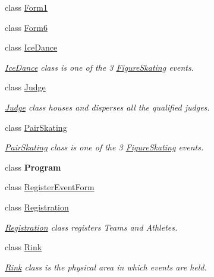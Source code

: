 \begin{DoxyCompactItemize}
class \hyperlink{classProject__Codename__Olympia__v1_1_1__0_1_1Form1}{Form1}
\item 
class \hyperlink{classProject__Codename__Olympia__v1_1_1__0_1_1Form6}{Form6}
\item 
class \hyperlink{classProject__Codename__Olympia__v1_1_1__0_1_1IceDance}{Ice\+Dance}
\begin{DoxyCompactList}\small\item\em \hyperlink{classProject__Codename__Olympia__v1_1_1__0_1_1IceDance}{Ice\+Dance} class is one of the 3 \hyperlink{classProject__Codename__Olympia__v1_1_1__0_1_1FigureSkating}{Figure\+Skating} events. \end{DoxyCompactList}\item 
class \hyperlink{classProject__Codename__Olympia__v1_1_1__0_1_1Judge}{Judge}
\begin{DoxyCompactList}\small\item\em \hyperlink{classProject__Codename__Olympia__v1_1_1__0_1_1Judge}{Judge} class houses and disperses all the qualified judges. \end{DoxyCompactList}\item 
class \hyperlink{classProject__Codename__Olympia__v1_1_1__0_1_1PairSkating}{Pair\+Skating}
\begin{DoxyCompactList}\small\item\em \hyperlink{classProject__Codename__Olympia__v1_1_1__0_1_1PairSkating}{Pair\+Skating} class is one of the 3 \hyperlink{classProject__Codename__Olympia__v1_1_1__0_1_1FigureSkating}{Figure\+Skating} events. \end{DoxyCompactList}\item 
class {\bfseries Program}
\item 
class \hyperlink{classProject__Codename__Olympia__v1_1_1__0_1_1RegisterEventForm}{Register\+Event\+Form}
\item 
class \hyperlink{classProject__Codename__Olympia__v1_1_1__0_1_1Registration}{Registration}
\begin{DoxyCompactList}\small\item\em \hyperlink{classProject__Codename__Olympia__v1_1_1__0_1_1Registration}{Registration} class registers Teams and Athletes. \end{DoxyCompactList}\item 
class \hyperlink{classProject__Codename__Olympia__v1_1_1__0_1_1Rink}{Rink}
\begin{DoxyCompactList}\small\item\em \hyperlink{classProject__Codename__Olympia__v1_1_1__0_1_1Rink}{Rink} class is the physical area in which events are held. \end{DoxyCompactList}\item 

\end{DoxyCompactItemize}
